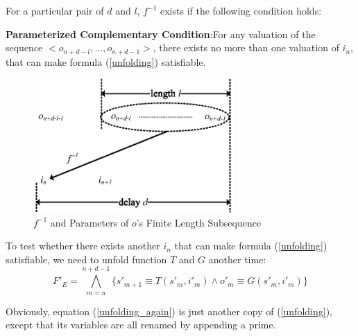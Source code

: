 \documentclass[journal]{IEEEtran}
\begin{document}
For a particular pair of $d$ and $l$,
$f^{-1}$ exists if the following condition holds:

\vspace{0.2cm}

\begin{definition11}\label{UniquenessAssumption}
\textbf{Parameterized Complementary Condition}:For any valuation of the sequence $<o_{n+d-l},\dots , o_{n+d-1} >$,
there exists no more than one valuation of $i_n$,
that can make formula (\ref{unfolding}) satisfiable.
\end{definition11}

\vspace{0.2cm}

\begin{figure}[t]
\centering
\includegraphics[width=3in]{dl}
\caption{$f^{-1}$ and Parameters of $o$'s Finite Length Subsequence }
\label{dl}
\end{figure}
To test whether there exists another $i_n$ that can make formula (\ref{unfolding}) satisfiable,
we need to unfold function $T$ and $G$ another time:
\begin{equation}\label{unfolding_again}
F'_{E}= \bigwedge_{m=n}^{n+d-1} \Big\{ s'_{m+1}\equiv T(s'_m,i'_m) \wedge  o'_m\equiv G(s'_m,i'_m) \Big\}
\end{equation}

Obviously,
equation (\ref{unfolding_again}) is just another copy of (\ref{unfolding}),
except that its variables are all renamed by appending a prime.
\end{document}
